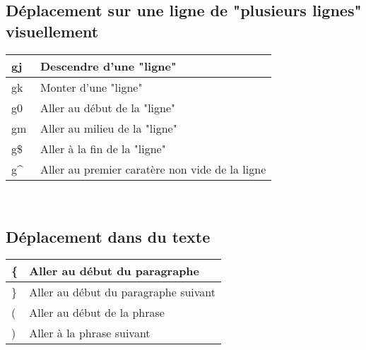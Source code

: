 \documentclass{article}
\begin{document}
\subsection{Déplacement sur une ligne de "plusieurs lignes" visuellement }
\begin{tabular}{|p{3cm}| l| }
\hline
gj & Descendre d'une "ligne"\\ \hline
gk & Monter d'une "ligne"\\ \hline
g0 & Aller au début de la "ligne"\\ \hline
gm & Aller au milieu de la "ligne"\\ \hline
g\$ & Aller à la fin de la "ligne"\\ \hline
g\^~ & Aller au premier caratère non vide de la ligne\\ \hline
\end{tabular}\\

\subsection{Déplacement dans du texte}
\begin{tabular}{|p{3cm}| l| }\hline
\{ & Aller au début du paragraphe \\ \hline
\} & Aller au début du paragraphe suivant \\ \hline
( & Aller au début de la phrase \\ \hline
) & Aller à la phrase suivant \\ \hline
\end{tabular}\\
\end{document}
